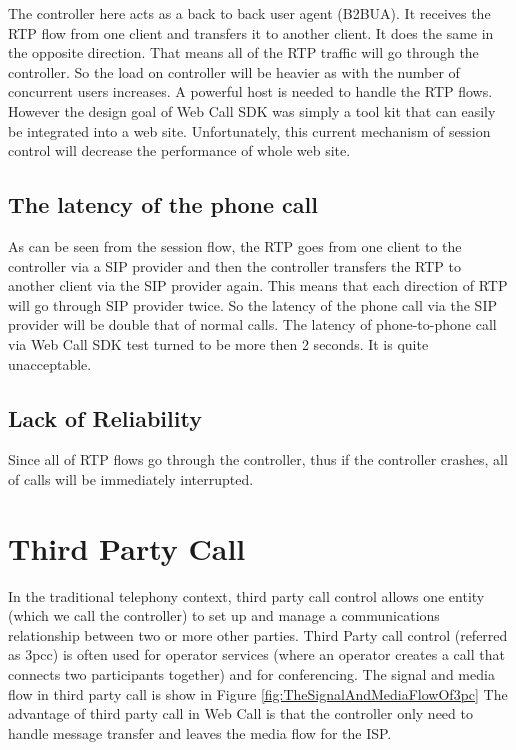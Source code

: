 The controller here acts as a back to back user agent (B2BUA). It receives the RTP flow from one client and transfers it to another client. It does the same in the opposite direction. That means all of the RTP traffic will go through the controller. So the load on controller will be heavier as with the number of concurrent users increases. A powerful host is needed to handle the RTP flows. However the design goal of Web Call SDK was simply a tool kit that can easily be integrated into a web site. Unfortunately, this  current mechanism of session control will decrease the performance of whole web site. 

\subsection{The latency of the phone call}
 
As can be seen from the session flow, the RTP goes from one client to the controller via a SIP provider and then the controller transfers the RTP to another client via the SIP provider again. This means that each direction of RTP will go through SIP provider twice. So the latency of the phone call via the SIP provider will be double that of normal calls.  The latency of phone-to-phone call via Web Call SDK test turned to be more then 2 seconds. It is quite unacceptable. 

\subsection{Lack of Reliability}

Since all of RTP flows go through the controller, thus if the controller crashes, all of calls will be immediately interrupted. 



\section{Third Party Call}
\label{sec:Solution:ThirdPartyCall}

In the traditional telephony context, third party call control allows one entity (which we call the controller) to set up and manage a communications relationship between two or more other parties. Third Party call control (referred as 3pcc) is often used for operator services (where an operator creates a call that connects two participants together) and for conferencing. The signal and media flow in third party call is show in Figure \ref{fig:TheSignalAndMediaFlowOf3pc} The advantage of third party call in Web Call is that the controller only need to handle message transfer and leaves the media flow for the ISP.

